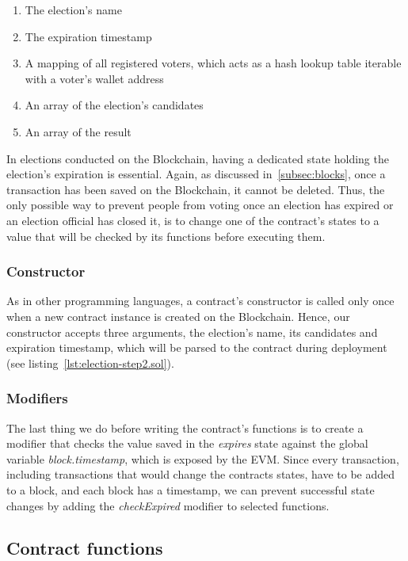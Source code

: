 \begin{enumerate}
    \item The election's name
    \item The expiration timestamp
    \item A mapping of all registered voters, which acts as a hash lookup table iterable with a voter's wallet address~\autocite[137]{antonopoulos_mastering_2019}
    \item An array of the election's candidates
    \item An array of the result
\end{enumerate}

In elections conducted on the \gls{Blockchain}, having a dedicated state holding the election's expiration is essential.
Again, as discussed in~\cref{subsec:blocks}, once a transaction has been saved on the \gls{Blockchain}, it cannot be deleted.
Thus, the only possible way to prevent people from voting once an election has expired or an election official has closed it, is to change one of the contract's states to a value that will be checked by its functions before executing them.

\subsubsection{Constructor}

As in other programming languages, a contract's constructor is called only once when a new contract instance is created on the \gls{Blockchain}.
Hence, our constructor accepts three arguments, the election's name, its candidates and expiration timestamp, which will be parsed to the contract during deployment (see listing~\ref{lst:election-step2.sol}).

\subsubsection{Modifiers}

The last thing we do before writing the contract's functions is to create a modifier that checks the value saved in the \emph{expires} state against the global variable \emph{block.timestamp}, which is exposed by the \gls{EVM}.
Since every transaction, including transactions that would change the contracts states, have to be added to a block, and each block has a timestamp, we can prevent successful state changes by adding the \emph{checkExpired} modifier to selected functions.

\subsection{Contract functions}\label{subsec:contract-functions}

